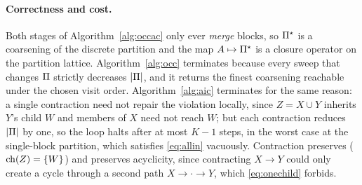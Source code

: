 \paragraph{Correctness and cost.}
Both stages of Algorithm~\ref{alg:occac} only ever \emph{merge} blocks, so
$\Pi^\star$ is a coarsening of the discrete partition and the map
$A \mapsto \Pi^\star$ is a closure operator on the partition lattice.
Algorithm~\ref{alg:occ} terminates because every sweep that changes $\Pi$ strictly
decreases $|\Pi|$, and it returns the finest \Onechild{} coarsening reachable under the
chosen visit order.
Algorithm~\ref{alg:aic} terminates for the same reason: a single contraction need not
repair the violation locally, since $Z = X \cup Y$ inherits $Y$'s child $W$ and members of
$X$ need not reach $W$; but each contraction reduces $|\Pi|$ by one, so the loop halts after
at most $K - 1$ steps, in the worst case at the single-block partition, which satisfies
\eqref{eq:allin} vacuously.
Contraction preserves \Onechild{} ($\operatorname{ch}(Z) = \{W\}$) and preserves acyclicity, since
contracting $X \to Y$ could only create a cycle through a second path $X \to \cdot \to Y$,
which \eqref{eq:onechild} forbids.
